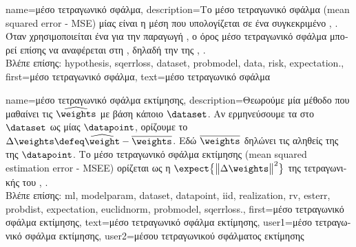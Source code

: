 {name={\foreignlanguage{greek}{μέσο τετραγωνικό σφάλμα}}, 
	description={\foreignlanguage{greek}{Το μέσο τετραγωνικό σφάλμα} 
		(mean squared error - MSE) \foreignlanguage{greek}{μίας}  \foreignlanguage{greek}{είναι η μέση}
         	 \foreignlanguage{greek}{που υπολογίζεται σε ένα συγκεκριμένο} 
		\cite{MLBasics}, \cite{hastie01statisticallearning}. 
		\foreignlanguage{greek}{Όταν χρησιμοποιείται ένα}  \foreignlanguage{greek}{για την παραγωγή} 
		, \foreignlanguage{greek}{ο όρος μέσο τετραγωνικό σφάλμα μπορεί επίσης να αναφέρεται στη}
		, \foreignlanguage{greek}{δηλαδή την}  \foreignlanguage{greek}{της} 
		 \cite{LC}, \cite{kay}.
		\\ 
		\foreignlanguage{greek}{Βλέπε επίσης:} \gls{hypothesis}, \gls{sqerrloss}, \gls{dataset}, \gls{probmodel}, \gls{data}, \gls{risk}, \gls{expectation}.}, 
 	first={\foreignlanguage{greek}{μέσο τετραγωνικό σφάλμα}}, 
 	text={\foreignlanguage{greek}{μέσο τετραγωνικό σφάλμα}}
}

{name={\foreignlanguage{greek}{μέσο τετραγωνικό σφάλμα εκτίμησης}},
	description={\foreignlanguage{greek}{Θεωρούμε μία μέθοδο} 
		 \foreignlanguage{greek}{που μαθαίνει τις}  $\widehat{\weights}$ 
		\foreignlanguage{greek}{με βάση κάποιο}  $\dataset$. 
		\foreignlanguage{greek}{Αν ερμηνεύσουμε τα}  \foreignlanguage{greek}{στο} $\dataset$ 
		\foreignlanguage{greek}{ως}   \foreignlanguage{greek}{μίας}  $\datapoint$, 
		\foreignlanguage{greek}{ορίζουμε το}  $\Delta \weights \defeq \widehat{\weight} - \overline{\weights}$. 
		\foreignlanguage{greek}{Εδώ $\overline{\weights}$ δηλώνει τις αληθείς}  \foreignlanguage{greek}{της} 
		 \foreignlanguage{greek}{της $\datapoint$. Το μέσο τετραγωνικό σφάλμα εκτίμησης} 
		(mean squared estimation error - MSEE) \foreignlanguage{greek}{ορίζεται ως η}  
		$\expect \big\{ \big\| \Delta \weights \big\|^{2} \big\}$ \foreignlanguage{greek}{της τετραγωνικής}
		 \foreignlanguage{greek}{του}  \cite{LC}, \cite{kay}.
		\\
		\foreignlanguage{greek}{Βλέπε επίσης:} \gls{ml}, \gls{modelparam}, \gls{dataset}, \gls{datapoint}, \gls{iid}, \gls{realization}, \gls{rv}, 
		\gls{esterr}, \gls{probdist}, \gls{expectation}, \gls{euclidnorm},  \gls{probmodel}, \gls{sqerrloss}.},
	first={\foreignlanguage{greek}{μέσο τετραγωνικό σφάλμα εκτίμησης}},
	text={\foreignlanguage{greek}{μέσο τετραγωνικό σφάλμα εκτίμησης}},
	user1={\foreignlanguage{greek}{μέσο τετραγωνικό σφάλμα εκτίμησης}}, %
    	user2={\foreignlanguage{greek}{μέσου τετραγωνικού σφάλματος εκτίμησης}} %
}

